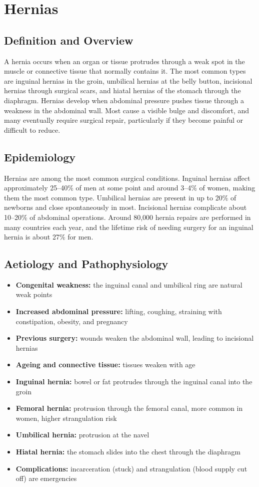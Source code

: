 \chapter{Hernias}

\section*{Definition and Overview}
A hernia occurs when an organ or tissue protrudes through a weak spot in the muscle or connective tissue that normally contains it. The most common types are inguinal hernias in the groin, umbilical hernias at the belly button, incisional hernias through surgical scars, and hiatal hernias of the stomach through the diaphragm. Hernias develop when abdominal pressure pushes tissue through a weakness in the abdominal wall. Most cause a visible bulge and discomfort, and many eventually require surgical repair, particularly if they become painful or difficult to reduce.

\section*{Epidemiology}
Hernias are among the most common surgical conditions. Inguinal hernias affect approximately 25--40\% of men at some point and around 3--4\% of women, making them the most common type. Umbilical hernias are present in up to 20\% of newborns and close spontaneously in most. Incisional hernias complicate about 10--20\% of abdominal operations. Around 80,000 hernia repairs are performed in many countries each year, and the lifetime risk of needing surgery for an inguinal hernia is about 27\% for men.

\section*{Aetiology and Pathophysiology}
\begin{itemize}
    \item \textbf{Congenital weakness:} the inguinal canal and umbilical ring are natural weak points
    \item \textbf{Increased abdominal pressure:} lifting, coughing, straining with constipation, obesity, and pregnancy
    \item \textbf{Previous surgery:} wounds weaken the abdominal wall, leading to incisional hernias
    \item \textbf{Ageing and connective tissue:} tissues weaken with age
    \item \textbf{Inguinal hernia:} bowel or fat protrudes through the inguinal canal into the groin
    \item \textbf{Femoral hernia:} protrusion through the femoral canal, more common in women, higher strangulation risk
    \item \textbf{Umbilical hernia:} protrusion at the navel
    \item \textbf{Hiatal hernia:} the stomach slides into the chest through the diaphragm
    \item \textbf{Complications:} incarceration (stuck) and strangulation (blood supply cut off) are emergencies
\end{itemize}

